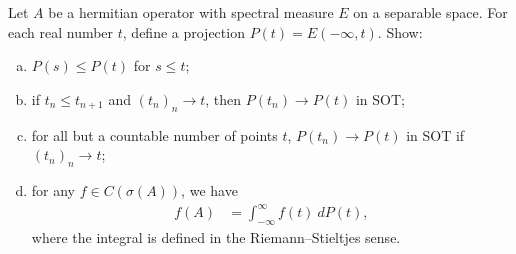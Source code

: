 \documentclass[10pt]{mypackage}
\begin{document}
\begin{problem}
  Let $A$ be a hermitian operator with spectral measure $E$ on a separable space. For each real number $t$, define a projection $P(t) = E\left( -\infty,t \right)$. Show:
  \begin{enumerate}[(a)]
    \item $P(s)\leq P(t)$ for $s\leq t$;
    \item if $t_n\leq t_{n+1}$ and $\left( t_n \right)_n\rightarrow t$, then $P\left( t_n \right)\rightarrow P(t)$ in SOT;
    \item for all but a countable number of points $t$, $P\left( t_n \right)\rightarrow P(t)$ in SOT if $\left( t_n \right)_n\rightarrow t$;
    \item for any $f\in C(\sigma(A))$, we have
      \begin{align*}
        f(A) &= \int_{-\infty}^{\infty} f(t)\:dP(t),
      \end{align*}
      where the integral is defined in the Riemann--Stieltjes sense.
  \end{enumerate}
\end{problem}
\end{document}
